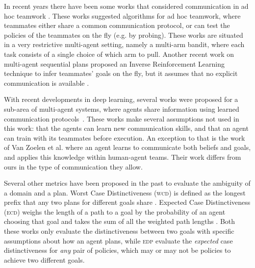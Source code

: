 \documentclass[letterpaper]{article}
\begin{document}
In recent years there have been some works that considered communication in ad hoc teamwork \cite{barrett2014communicating,chakraborty2017coordinated}.
These works suggested algorithms for ad hoc teamwork, where teammates either share a common communication protocol, or can test the policies of the teammates on the fly (e.g. by probing).
These works are situated in a very restrictive multi-agent setting, namely a multi-arm bandit, where each task consists of a single choice of which arm to pull. Another recent work on multi-agent sequential plans proposed an Inverse Reinforcement Learning technique to infer teammates' goals on the fly, but it assumes that no explicit communication is available \cite{wang2020too}.

With recent developments in deep learning, several works were proposed for a sub-area of multi-agent systems, where agents share information using learned communication protocols~\cite{hernandez2019survey,mordatch2018emergence,foerster2016learning}. These works make several assumptions not used in this work: that the agents can learn new communication skills, and that an agent can train with its teammates before execution. An exception to that is the work of Van Zoelen et al.  where an agent learns to communicate both beliefs and goals, and applies this knowledge within human-agent teams. Their work differs from ours in the type of communication they allow.

Several other metrics have been proposed in the past to evaluate the ambiguity of a domain and a plan. Worst Case Distinctiveness (\textsc{wcd}) is defined as the longest prefix that any two plans for different goals share \cite{keren2014goal}. Expected Case Distinctiveness (\textsc{ecd}) weighs the length of a path to a goal by the probability of an agent choosing that goal and takes the sum of all the weighted path lengths \cite{wayllace2017new}. Both these works only evaluate the distinctiveness between two goals with specific assumptions about how an agent plans, while \textsc{edp} evaluate the \emph{expected} case distinctiveness for \emph{any} pair of policies, which may or may not be policies to achieve two different goals.
\end{document}
